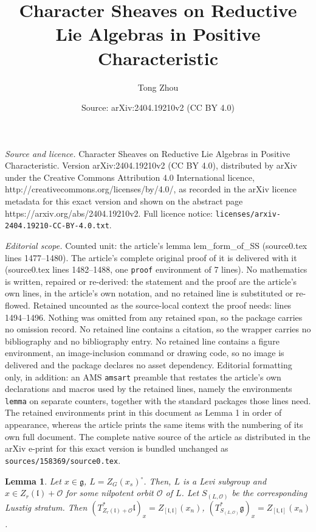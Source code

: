 \documentclass[10pt,a4paper]{amsart}
\title{Character Sheaves on Reductive Lie Algebras in Positive Characteristic}
\author{Tong Zhou}
\date{Source: arXiv:2404.19210v2 (CC BY 4.0)}
\newtheorem{lemma}{Lemma}
\newcommand{\CO}{\mathcal{O}}
\newcommand{\fl}{\mathfrak{l}}
\newcommand{\g}{\mathfrak{g}}
\begin{document}
\maketitle

\noindent\emph{Source and licence.} Character Sheaves on Reductive Lie Algebras in Positive Characteristic. Version arXiv:2404.19210v2 (CC BY 4.0), distributed by arXiv under the Creative Commons Attribution 4.0 International licence, http://creativecommons.org/licenses/by/4.0/, as recorded in the arXiv licence metadata for this exact version and shown on the abstract page https://arxiv.org/abs/2404.19210v2. Full licence notice: \texttt{licenses/arxiv-2404.19210-CC-BY-4.0.txt}.\par\smallskip

\noindent\textit{Editorial scope.} Counted unit: the article's lemma lem\_form\_of\_SS (source0.tex lines 1477--1480). The article's complete original proof of it is delivered with it (source0.tex lines 1482--1488, one \texttt{proof} environment of 7 lines). No mathematics is written, repaired or re-derived: the statement and the proof are the article's own lines, in the article's own notation, and no retained line is substituted or re-flowed.  Retained uncounted as the source-local context the proof needs: lines 1494--1496.  Nothing was omitted from any retained span, so the package carries no omission record.  No retained line contains a citation, so the wrapper carries no bibliography and no bibliography entry.  No retained line contains a figure environment, an image-inclusion command or drawing code, so no image is delivered and the package declares no asset dependency.  Editorial formatting only, in addition: an AMS \texttt{amsart} preamble that restates the article's own declarations and macros used by the retained lines, namely the environments \texttt{lemma} on separate counters, together with the standard packages those lines need.  The retained environments print in this document as Lemma 1 in order of appearance, whereas the article prints the same items with the numbering of its own full document.  The complete native source of the article as distributed in the arXiv e-print for this exact version is bundled unchanged as \texttt{sources/158369/source0.tex}.
\begin{lemma}\label{lem_conormal_comp}
    Let $x\in\g$, $L=Z_G(x_s)^\circ$. Then, $L$ is a Levi subgroup and $x\in Z_r(\fl)+\CO$ for some nilpotent orbit $\CO$ of $L$. Let $S_{(L,\CO)}$ be the corresponding Lusztig stratum. Then $(T^*_{Z_r(\fl)+\CO}\fl)_x=Z_{[\fl,\fl]}(x_n)$,  $(T^*_{S_{(L,\CO)}}\g)_x=Z_{[\fl,\fl]}(x_n)$.
\end{lemma}
\end{document}
